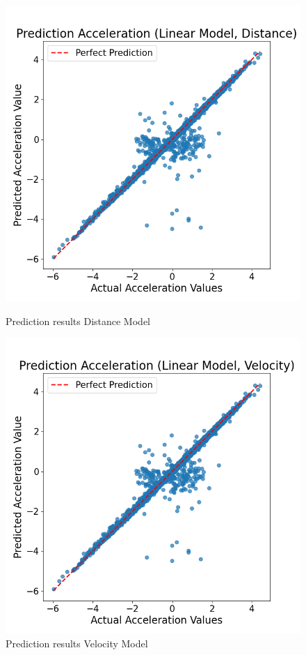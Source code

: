 \begin{figure}[h]
    \centering
    \begin{minipage}[b]{0.45\columnwidth}
        \centering
        \includegraphics[width=\columnwidth]{images/figures/Prediction Acceleration (Linear Model, Distance).png}
        \caption{Prediction results Distance Model}
        \label{fig:prediciton_acceleration_distance}
    \end{minipage}
    \hfill
    \begin{minipage}[b]{0.45\columnwidth}
        \centering
        \includegraphics[width=\columnwidth]{images/figures/Prediction Acceleration (Linear Model, Velocity).png}
        \caption{Prediction results Velocity Model}
        \label{fig:prediciton_acceleration_velocity}
    \end{minipage}
\end{figure}

